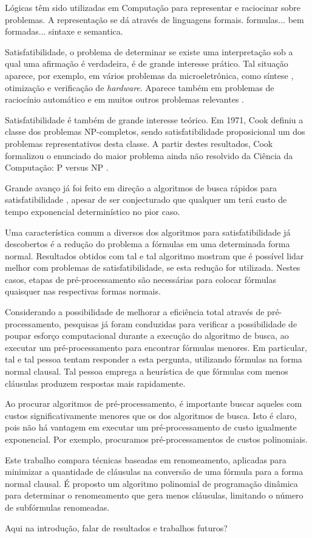 \indent

Lógicas têm sido utilizadas em Computação para representar e raciocinar sobre problemas. A representação se dá através de linguagens formais. formulas... bem formadas... sintaxe e semantica.

Satisfatibilidade, o problema de determinar se existe uma interpretação sob a qual uma afirmação é verdadeira, é de grande interesse prático. Tal situação aparece, por exemplo, em vários problemas da microeletrônica, como síntese \cite{bloem2014sat}, otimização \cite{gupta2006sat} e verificação \cite{nieuwenhuis2006sat} de \textit{hardware}. Aparece também em problemas de raciocínio automático \cite{harrison2009handbook} e em muitos outros problemas relevantes \cite{horvitz1992automated}.

Satisfatibilidade é também de grande interesse teórico. Em 1971, Cook definiu a classe dos problemas NP-completos, sendo satisfatibilidade proposicional um dos problemas representativos desta classe. A partir destes resultados, Cook formalizou o enunciado do maior problema ainda não resolvido da Ciência da Computação: P versus NP \cite{cook1971complexity}.

Grande avanço já foi feito em direção a algoritmos de busca rápidos para satisfatibilidade \cite{davis1960computing,davis1962machine,biere2009conflict}, apesar de ser conjecturado que qualquer um terá custo de tempo exponencial determinístico no pior caso.

Uma característica comum a diversos dos algoritmos para satisfatibilidade já descobertos é a redução do problema a fórmulas em uma determinada forma normal. Resultados obtidos com tal e tal algoritmo mostram que é possível lidar melhor com problemas de satisfatibilidade, se esta redução for utilizada. Nestes casos, etapas de pré-processamento são necessárias para colocar fórmulas quaisquer nas respectivas formas normais.

Considerando a possibilidade de melhorar a eficiência total através de pré-processa\-mento, pesquisas já foram conduzidas para verificar a possibilidade de poupar esforço computacional durante a execução do algoritmo de busca, ao executar um pré-processamento para encontrar fórmulas menores. Em particular, tal e tal pessoa tentam responder a esta pergunta, utilizando fórmulas na forma normal clausal. Tal pessoa emprega a heurística de que fórmulas com menos cláusulas produzem respostas mais rapidamente.

Ao procurar algoritmos de pré-processamento, é importante buscar aqueles com custos significativamente menores que os dos algoritmos de busca. Isto é claro, pois não há vantagem em executar um pré-processamento de custo igualmente exponencial. Por exemplo, procuramos pré-processamentos de custos polinomiais.

Este trabalho compara técnicas baseadas em renomeamento, aplicadas para minimizar a quantidade de cláusulas na conversão de uma fórmula para a forma normal clausal. É proposto um algoritmo polinomial de programação dinâmica para determinar o renomeamento que gera menos cláusulas, limitando o número de subfórmulas renomeadas.

Aqui na introdução, falar de resultados e trabalhos futuros?
